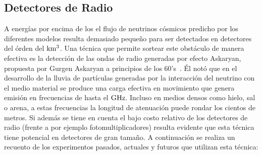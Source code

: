 	\subsection{Detectores de Radio}
	A energ\'ias por encima de los  el flujo de neutrinos c\'osmicos predicho por los diferentes modelos resulta demasiado peque\~no para ser detectados en detectores del \'orden del $\rm km^3$. 
	Una t\'ecnica que permite sortear este obst\'aculo de manera efectiva es la detecci\'on de las ondas de radio generadas por efecto Askaryan, propuesta por Gurgen Askaryan a principios de los 60's~\cite{cite:Askaryan}.
	\'El not\'o que en el desarrollo de la lluvia de part\'iculas generadas por la interacci\'on del neutrino con el medio material se produce una carga efectiva en movimiento que genera emisi\'on \cher{} en frecuencias de hasta el $\rm GHz$.
	Incluso en medios densos como hielo, sal o arena, a estas frecuencias la longitud de atenuaci\'on puede rondar los cientos de metros.
	Si adem\'as se tiene en cuenta el bajo costo relativo de los detectores de radio (frente a por ejemplo fotomultiplicadores) resulta evidente que esta t\'ecnica tiene potencial en detectores de gran tama\~no.
	A continuaci\'on se realiza un recuento de los experimentos pasados, actuales y futuros que utilizan esta t\'ecnica:
